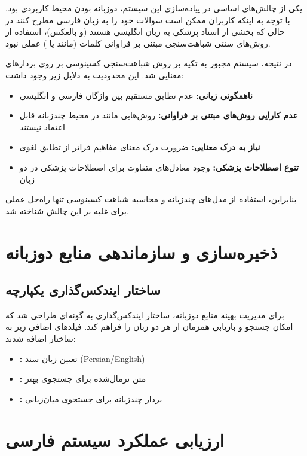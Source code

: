 \documentclass[11pt, a4paper, oneside]{book}
\begin{document}
	یکی از چالش‌های اساسی در پیاده‌سازی این سیستم، دوزبانه بودن محیط کاربردی بود. با توجه به اینکه کاربران ممکن است سوالات خود را به زبان فارسی مطرح کنند در حالی که بخشی از اسناد پزشکی به زبان انگلیسی هستند (و بالعکس)، استفاده از روش‌های سنتی شباهت‌سنجی مبتنی بر فراوانی کلمات (مانند  یا ) عملی نبود.

	در نتیجه، سیستم مجبور به تکیه بر روش شباهت‌سنجی کسینوسی بر روی بردارهای معنایی شد. این محدودیت به دلایل زیر وجود داشت:

	\begin{itemize}
		\item \textbf{ناهمگونی زبانی:} عدم تطابق مستقیم بین واژگان فارسی و انگلیسی
		\item \textbf{عدم کارایی روش‌های مبتنی بر فراوانی:} روش‌هایی مانند  در محیط چندزبانه قابل اعتماد نیستند
		\item \textbf{نیاز به درک معنایی:} ضرورت درک معنای مفاهیم فراتر از تطابق لغوی
		\item \textbf{تنوع اصطلاحات پزشکی:} وجود معادل‌های متفاوت برای اصطلاحات پزشکی در دو زبان
	\end{itemize}

	بنابراین، استفاده از مدل‌های  چندزبانه و محاسبه شباهت کسینوسی تنها راه‌حل عملی برای غلبه بر این چالش شناخته شد.

	\section{ذخیره‌سازی و سازماندهی منابع دوزبانه}

	\subsection{ساختار ایندکس‌گذاری یکپارچه}
	برای مدیریت بهینه منابع دوزبانه، ساختار ایندکس‌گذاری به گونه‌ای طراحی شد که امکان جستجو و بازیابی همزمان از هر دو زبان را فراهم کند. فیلدهای اضافی زیر به ساختار اضافه شدند:

	\begin{itemize}
		\item \textbf{:} تعیین زبان سند (Persian/English)
		\item \textbf{:} متن نرمال‌شده برای جستجوی بهتر
		\item \textbf{:} بردار چندزبانه برای جستجوی میان‌زبانی
	\end{itemize}

	\section{ارزیابی عملکرد سیستم  فارسی}
\end{document}
